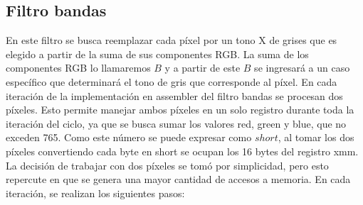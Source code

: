 \documentclass[a4paper]{article}
\begin{document}
\subsection{Filtro bandas}
En este filtro se busca reemplazar cada píxel por un tono X de grises que es elegido a partir de la suma de sus componentes RGB. La suma de los componentes RGB lo llamaremos $B$ y a partir de este $B$ se ingresará a un caso específico que determinará el tono de gris que corresponde al píxel.
En cada iteración de la implementación en assembler del filtro bandas se procesan dos píxeles. Esto permite manejar ambos píxeles en un solo registro durante toda la iteración del ciclo, ya que se busca sumar los valores red, green y blue, que no exceden 765. Como este número se puede expresar como $short$, al tomar los dos píxeles convertiendo cada byte en short se ocupan los 16 bytes del registro xmm. La decisión de trabajar con dos píxeles se tomó por simplicidad, pero esto repercute en que se genera una mayor cantidad de accesos a memoria.
En cada iteración, se realizan los siguientes pasos: 
\end{document}
